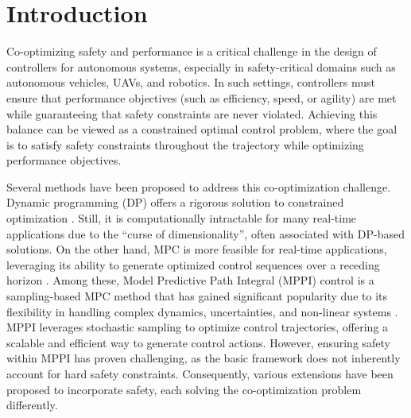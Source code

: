 \section{Introduction}

Co-optimizing safety and performance is a critical challenge in the design of controllers for autonomous systems, especially in safety-critical domains such as autonomous vehicles, UAVs, and robotics. In such settings, controllers must ensure that performance objectives (such as efficiency, speed, or agility) are met while guaranteeing that safety constraints are never violated. Achieving this balance can be viewed as a constrained optimal control problem, where the goal is to satisfy safety constraints throughout the trajectory while optimizing performance objectives.

Several methods have been proposed to address this co-optimization challenge. Dynamic programming (DP) offers a rigorous solution to constrained optimization \cite{one_stage_DP,Wang2024coopt_constrained}. Still, it is computationally intractable for many real-time applications due to the ``curse of dimensionality'', often associated with DP-based solutions. 
On the other hand, MPC is more feasible for real-time applications, leveraging its ability to generate optimized control sequences over a receding horizon \cite{schwenzer2021review,borrelli2017predictive}. 
Among these, Model Predictive Path Integral (MPPI) control is a sampling-based MPC method that has gained significant popularity due to its flexibility in handling complex dynamics, uncertainties, and non-linear systems \cite{mppi,mppi_tro}. 
MPPI leverages stochastic sampling to optimize control trajectories, offering a scalable and efficient way to generate control actions. 
However, ensuring safety within MPPI has proven challenging, as the basic framework does not inherently account for hard safety constraints. 
Consequently, various extensions have been proposed to incorporate safety, each solving the co-optimization problem differently.


